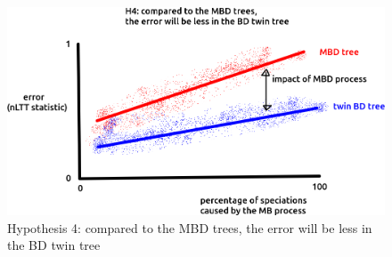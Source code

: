 \begin{figure}[!htbp]
  \includegraphics[width=\textwidth]{razzo-figures/fig_h_4.png}
  \caption{
    Hypothesis 4: compared to the MBD trees, 
    the error will be less in the BD twin tree
  }
  \label{fig:h_4}
\end{figure}
